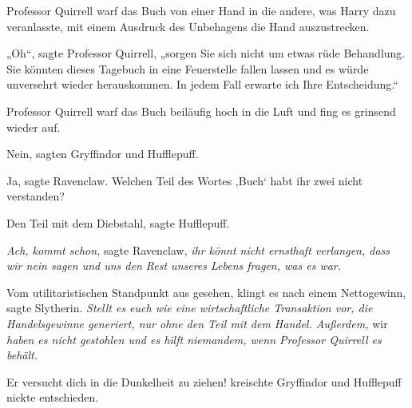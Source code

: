 Professor Quirrell warf das Buch von einer Hand in die andere, was Harry dazu veranlasste, mit einem Ausdruck des Unbehagens die Hand auszustrecken.

„Oh“, sagte Professor Quirrell, „sorgen Sie sich nicht um etwas rüde Behandlung. Sie könnten dieses Tagebuch in eine Feuerstelle fallen lassen und es würde unversehrt wieder herauskommen. In jedem Fall erwarte ich Ihre Entscheidung.“

Professor Quirrell warf das Buch beiläufig hoch in die Luft und fing es grinsend wieder auf.

Nein, sagten Gryffindor und Hufflepuff.

Ja, sagte Ravenclaw. Welchen Teil des Wortes ‚Buch‘ habt ihr zwei nicht verstanden?

Den Teil mit dem Diebstahl, sagte Hufflepuff.

\emph{Ach, kommt schon,} sagte Ravenclaw, \emph{ihr könnt nicht ernsthaft verlangen, dass wir nein sagen und uns den Rest unseres Lebens fragen, was es war.}

Vom utilitaristischen Standpunkt aus gesehen, klingt es nach einem Nettogewinn, sagte Slytherin. \emph{Stellt es euch wie eine wirtschaftliche Transaktion vor, die Handelsgewinne generiert, nur ohne den Teil mit dem Handel. Außerdem,} wir \emph{haben es nicht gestohlen und es hilft niemandem, wenn Professor Quirrell es behält.}

Er versucht dich in die Dunkelheit zu ziehen! kreischte Gryffindor und Hufflepuff nickte entschieden.


